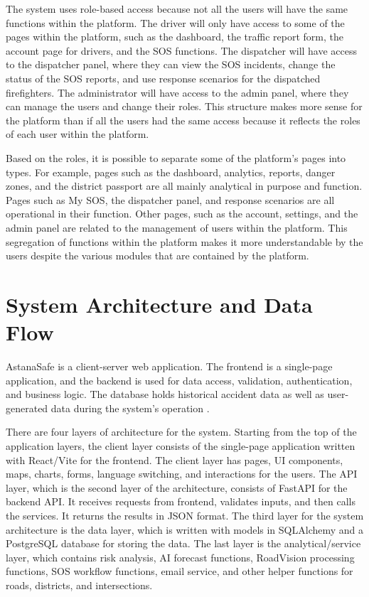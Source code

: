 ﻿\documentclass[12pt,a4paper]{report}
\begin{document}
The system uses role-based access because not all the users will have the same functions within the platform. The driver will only have access to some of the pages within the platform, such as the dashboard, the traffic report form, the account page for drivers, and the SOS functions. The dispatcher will have access to the dispatcher panel, where they can view the SOS incidents, change the status of the SOS reports, and use response scenarios for the dispatched firefighters. The administrator will have access to the admin panel, where they can manage the users and change their roles. This structure makes more sense for the platform than if all the users had the same access because it reflects the roles of each user within the platform.

Based on the roles, it is possible to separate some of the platform's pages into types. For example, pages such as the dashboard, analytics, reports, danger zones, and the district passport are all mainly analytical in purpose and function. Pages such as My SOS, the dispatcher panel, and response scenarios are all operational in their function. Other pages, such as the account, settings, and the admin panel are related to the management of users within the platform. This segregation of functions within the platform makes it more understandable by the users despite the various modules that are contained by the platform.

\section{System Architecture and Data Flow}

AstanaSafe is a client-server web application. The frontend is a single-page application, and the backend is used for data access, validation, authentication, and business logic. The database holds historical accident data as well as user-generated data during the system's operation \cite{chen2012}.

There are four layers of architecture for the system. Starting from the top of the application layers, the client layer consists of the single-page application written with React/Vite for the frontend. The client layer has pages, UI components, maps, charts, forms, language switching, and interactions for the users. The API layer, which is the second layer of the architecture, consists of FastAPI for the backend API. It receives requests from frontend, validates inputs, and then calls the services. It returns the results in JSON format. The third layer for the system architecture is the data layer, which is written with models in SQLAlchemy and a PostgreSQL database for storing the data. The last layer is the analytical/service layer, which contains risk analysis, AI forecast functions, RoadVision processing functions, SOS workflow functions, email service, and other helper functions for roads, districts, and intersections.
\end{document}
